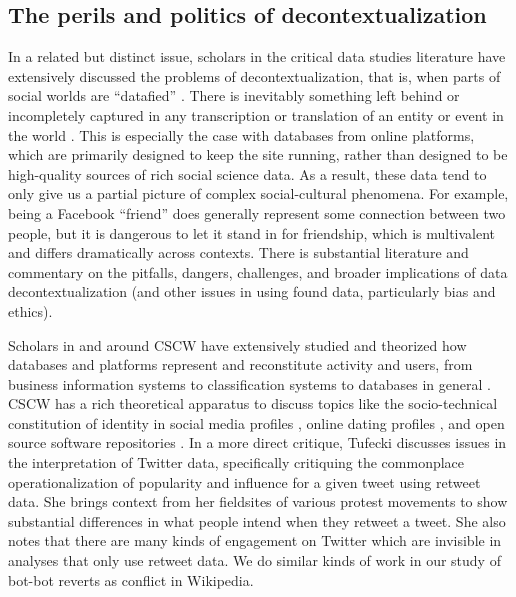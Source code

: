 \documentclass[format=acmsmall, review=false, screen=true]{acmart}%
\begin{document}
\subsection{The perils and politics of decontextualization} \label{s:epist:decontext}
In a related but distinct issue, scholars in the critical data studies literature have extensively discussed the problems of decontextualization, that is, when parts of social worlds are ``datafied'' \cite{boyd2012,vanDijck2014}. There is inevitably something left behind or incompletely captured in any transcription or translation of an entity or event in the world \cite{Plato370, Kant1781, Callon1986}. This is especially the case with databases from online platforms, which are primarily designed to keep the site running, rather than designed to be high-quality sources of rich social science data. As a result, these data tend to only give us a partial picture of complex social-cultural phenomena. For example, being a Facebook ``friend'' does generally represent some connection between two people, but it is dangerous to let it stand in for friendship, which is multivalent and differs dramatically across contexts. There is substantial literature and commentary on the pitfalls, dangers, challenges, and broader implications of data decontextualization (and other issues in using found data, particularly bias and ethics). 

Scholars in and around CSCW have extensively studied and theorized how databases and platforms represent and reconstitute activity and users, from business information systems \cite{Orlikowski1992} to classification systems \cite{Bowker1999} to databases in general \cite{Agre1997}. CSCW has a rich theoretical apparatus to discuss topics like the socio-technical constitution of identity in social media profiles \cite{Brubaker2011}, online dating profiles \cite{Birnholtz2014}, and open source software repositories \cite{Marlow2013}. In a more direct critique, Tufecki \cite{Tufekci2014} discusses issues in the interpretation of Twitter data, specifically critiquing the commonplace operationalization of popularity and influence for a given tweet using retweet data. She brings context from her fieldsites of various protest movements to show substantial differences in what people intend when they retweet a tweet. She also notes that there are many kinds of engagement on Twitter which are invisible in analyses that only use retweet data. We do similar kinds of work in our study of bot-bot reverts as conflict in Wikipedia.
\end{document}
